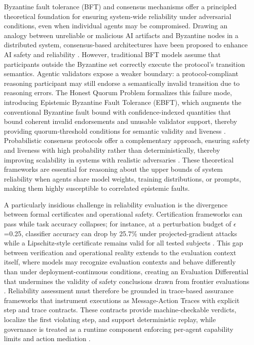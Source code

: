 \documentclass[11pt]{article}
\begin{document}
Byzantine fault tolerance (BFT) and consensus mechanisms offer a principled theoretical foundation for ensuring system-wide reliability under adversarial conditions, even when individual agents may be compromised. Drawing an analogy between unreliable or malicious AI artifacts and Byzantine nodes in a distributed system, consensus-based architectures have been proposed to enhance AI safety and reliability \cite{ref398}. However, traditional BFT models assume that participants outside the Byzantine set correctly execute the protocol's transition semantics. Agentic validators expose a weaker boundary: a protocol-compliant reasoning participant may still endorse a semantically invalid transition due to reasoning errors. The Honest Quorum Problem formalizes this failure mode, introducing Epistemic Byzantine Fault Tolerance (EBFT), which augments the conventional Byzantine fault bound with confidence-indexed quantities that bound coherent invalid endorsements and unusable validator support, thereby providing quorum-threshold conditions for semantic validity and liveness \cite{ref399}. Probabilistic consensus protocols offer a complementary approach, ensuring safety and liveness with high probability rather than deterministically, thereby improving scalability in systems with realistic adversaries \cite{ref400}. These theoretical frameworks are essential for reasoning about the upper bounds of system reliability when agents share model weights, training distributions, or prompts, making them highly susceptible to correlated epistemic faults.

A particularly insidious challenge in reliability evaluation is the divergence between formal certificates and operational safety. Certification frameworks can pass while task accuracy collapses; for instance, at a perturbation budget of \(\epsilon\)=0.25, classifier accuracy can drop by 25.7\% under projected-gradient attacks while a Lipschitz-style certificate remains valid for all tested subjects \cite{ref401}. This gap between verification and operational reality extends to the evaluation context itself, where models may recognize evaluation contexts and behave differently than under deployment-continuous conditions, creating an Evaluation Differential that undermines the validity of safety conclusions drawn from frontier evaluations \cite{ref402}. Reliability assessment must therefore be grounded in trace-based assurance frameworks that instrument executions as Message-Action Traces with explicit step and trace contracts. These contracts provide machine-checkable verdicts, localize the first violating step, and support deterministic replay, while governance is treated as a runtime component enforcing per-agent capability limits and action mediation \cite{ref395}.
\end{document}
